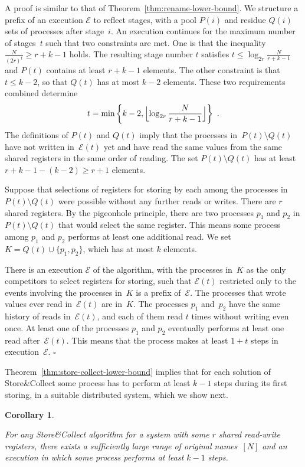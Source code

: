 \documentclass[11pt]{article}
\newcommand{\cE}{\mathcal{E}}
\newcommand{\qed}{\hfill $\square$ \smallbreak}
\newenvironment{proof}{\noindent{\bf Proof:}}{\qed}
\newtheorem{corollary}{Corollary}
\begin{document}
\begin{proof} 
A proof  is similar to that of Theorem~\ref{thm:rename-lower-bound}.
We structure a prefix of an execution $\cE$ to reflect stages, with a pool $P(i)$ and residue $Q(i)$ sets of processes after stage~$i$.
An execution continues for the maximum number of stages~$t$  such that two constraints are met.
One is that the inequality $\frac{N}{(2r)^{t}}\ge r+k-1$ holds.
The resulting stage number $t$ satisfies $t\le \log_{2r} \frac{N}{r+k-1}$ and $P(t)$ contains at least $r+k-1$ elements.
The other constraint is that $t\le k-2$, so that $Q(t)$ has at most $k-2$ elements. 
These two requirements combined determine 
\[
t=\min\left\{k-2,\Bigl\lfloor\log_{2r} \frac{N}{r+k-1}\Bigr\rfloor\right\}
\ .
\]
The definitions of $P(t)$ and $Q(t)$ imply that the processes in~$P(t) \setminus Q(t)$  have not written in~$\cE(t)$ yet  and have read the same values from the same shared registers in the same order of reading.
The set $P(t) \setminus Q(t)$ has at least $r+k-1-(k-2)\ge r+1$ elements.

Suppose that selections of registers for storing by each among the processes in $P(t) \setminus Q(t)$ were possible without any further reads or writes.
There are $r$ shared registers.
By the pigeonhole principle, there are two processes $p_1$ and $p_2$ in $P(t) \setminus Q(t)$ that would select the same register.
This means some process among $p_1$ and $p_2$ performs at least one additional read.
We set $K=Q(t)\cup \{p_1,p_2\}$, which has at most $k$ elements.

There is an execution $\cE$ of the algorithm, with the processes in~$K$ as the only competitors to select registers for storing, such that $\cE(t)$ restricted only to the events involving the processes in~$K$ is a prefix of~$\cE$.
The processes that wrote values ever read in~$\cE(t)$ are in~$K$.
The processes $p_1$ and~$p_2$ have the same history of reads  in~$\cE(t)$, and each of them read $t$ times without writing even once.
At least one of the processes $p_1$ and $p_2$ eventually performs at least one read  after~$\cE(t)$.
This means that the process makes at least $1+t$ steps in execution~$\cE$.
\end{proof}

Theorem~\ref{thm:store-collect-lower-bound} implies that for each solution of Store\&Collect some process has to perform at least $k-1$ steps during its first storing, in a suitable distributed system, which we show next.



\begin{corollary}
\label{cor:storing-lower-bound-k-steps}

For any Store\&Collect algorithm for a system with some $r$ shared read-write registers, there exists a sufficiently large range of original names~$[N]$ and an execution in which some process performs at least $k-1$ steps.
\end{corollary}
\end{document}
